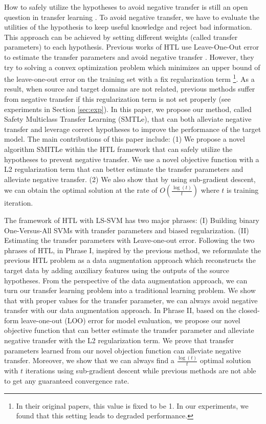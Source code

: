 How to safely utilize the hypotheses to avoid negative transfer is still an open question in transfer learning \cite{Lu201514}. To avoid negative transfer, we have to evaluate the utilities of the hypothesis to keep useful knowledge and reject bad information. This approach can be achieved by setting different weights (called transfer parameters) to each hypothesis.
Previous works of HTL use Leave-One-Out error to estimate the transfer parameters and avoid negative transfer \cite{tommasi2014learning} \cite{kuzborskij2013n}. However, they try to solving a convex
optimization problem which minimizes an upper bound of
the leave-one-out error on the training set with a fix regularization term \footnote{In their original papers, this value is fixed to be 1. In our experiments, we found that this setting leads to degraded performance.}. As a result, when source and target domains are not related, previous methods suffer from negative transfer if this regularization term is not set properly (see experiments in Section \ref{sec:exp}).
In this paper, we propose our method, {called Safety Multiclass Transfer Learning (SMTLe)}, that can both alleviate negative transfer and leverage correct hypotheses to improve the performance of the target model. 
The main contributions of this paper include: (1) We propose a novel algorithm SMITLe within the HTL framework that can safely utilize the hypotheses to prevent negative transfer. We use a novel objective function with a L2 regularization term that can better estimate the transfer parameters and alleviate negative transfer. (2) We also show that by using sub-gradient descent, we can obtain the optimal solution at the rate of $O(\frac{\log(t)}{t})$ where $t$ is training iteration.
 
The framework of HTL with LS-SVM has two major phrases: (I) Building binary One-Versus-All SVMs with transfer parameters and biased regularization. (II) Estimating the transfer parameters with Leave-one-out error.
Following the two phrases of HTL, in Phrase I, inspired by the previous method, we reformulate the previous HTL problem as a data augmentation approach which reconstructs the target data by adding auxiliary features using the outputs of the source hypotheses. From the perspective of the data augmentation approach, we can turn our transfer learning problem into a traditional learning problem. We show that with proper values for the transfer parameter, we can always avoid negative transfer with our data augmentation approach. 
In Phrase II, 
based on the closed-form leave-one-out (LOO) error for model evaluation, we propose our novel objective function that can better estimate the transfer parameter and alleviate negative transfer with the L2 regularization term. We prove that transfer parameters learned from our novel objection function can alleviate negative transfer. Moreover, we show that we can always find a $\frac{\log(t)}{t}$ optimal solution with $t$ iterations using sub-gradient descent while previous methods are not able to get any guaranteed convergence rate.


